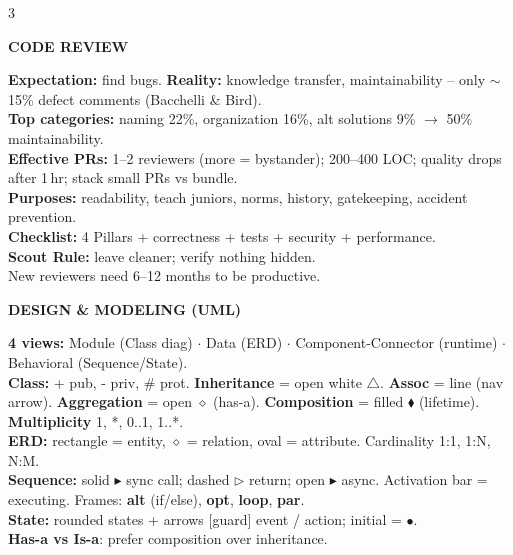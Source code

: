 \documentclass[10pt,letterpaper]{article}
\newenvironment{topic}[1]{%
  \par\addvspace{1.5pt}%
  \noindent\colorbox{hdrBG}{%
    \begin{minipage}{\dimexpr\linewidth-2\fboxsep\relax}%
      \centering\bfseries\sffamily\fontsize{6pt}{7pt}\selectfont\color{hdrFG}\MakeUppercase{#1}%
    \end{minipage}%
  }\par\nobreak\vskip0.5pt%
  \begingroup\setlength{\leftskip}{0pt}\setlength{\rightskip}{0pt}%
}{%
  \endgroup\par\addvspace{0.5pt}%
}
\newcommand{\hd}[1]{\textcolor{accent}{\textbf{#1}}}
\newcommand{\cn}[1]{{\ttfamily\small #1}}
\begin{document}
\begin{multicols*}{3}
\begin{topic}{Code Review}
\hd{Expectation:} find bugs. \hd{Reality:} knowledge transfer, maintainability -- only $\sim$15\% defect comments (Bacchelli \& Bird).\\
\hd{Top categories:} naming 22\%, organization 16\%, alt solutions 9\% $\to$ 50\% maintainability.\\
\hd{Effective PRs:} 1--2 reviewers (more = bystander); 200--400 LOC; quality drops after 1\,hr; stack small PRs vs bundle.\\
\hd{Purposes:} readability, teach juniors, norms, history, gatekeeping, accident prevention.\\
\hd{Checklist:} 4 Pillars + correctness + tests + security + performance.\\
\hd{Scout Rule:} leave cleaner; verify nothing hidden.\\
New reviewers need 6--12 months to be productive.
\end{topic}

\begin{topic}{Design \& Modeling (UML)}
\hd{4 views:} Module (Class diag) $\cdot$ Data (ERD) $\cdot$ Component-Connector (runtime) $\cdot$ Behavioral (Sequence/State).\\
\hd{Class:} \cn{+} pub, \cn{-} priv, \cn{\#} prot. \textbf{Inheritance} = open white $\triangle$. \textbf{Assoc} = line (nav arrow). \textbf{Aggregation} = open $\diamond$ (has-a). \textbf{Composition} = filled $\blacklozenge$ (lifetime). \textbf{Multiplicity} 1, *, 0..1, 1..*.\\
\hd{ERD:} rectangle = entity, $\diamond$ = relation, oval = attribute. Cardinality 1:1, 1:N, N:M.\\
\hd{Sequence:} solid $\blacktriangleright$ sync call; dashed $\triangleright$ return; open $\blacktriangleright$ async. Activation bar = executing. Frames: \textbf{alt} (if/else), \textbf{opt}, \textbf{loop}, \textbf{par}.\\
\hd{State:} rounded states + arrows \cn{[guard] event / action}; initial = $\bullet$.\\
\hd{Has-a vs Is-a}: prefer composition over inheritance.
\end{topic}


\end{multicols*}
\end{document}
